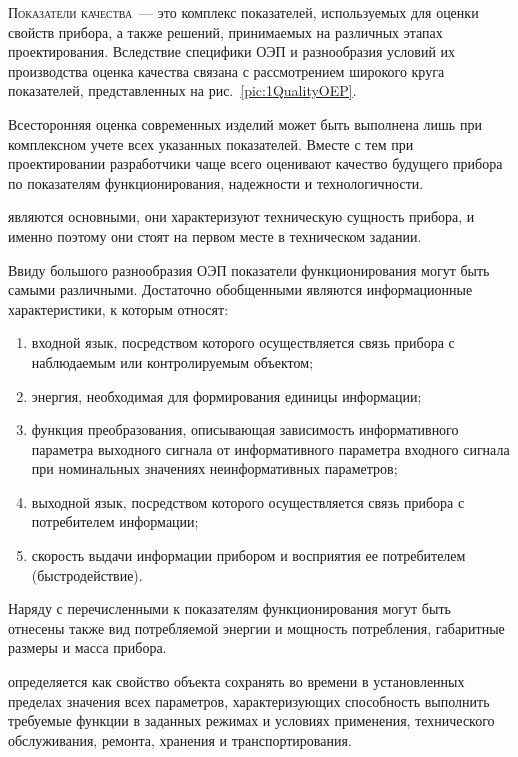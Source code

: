\documentclass{tufte-book}
\begin{document}
\textsc{Показатели качества}~--- это комплекс показателей, используемых для оценки свойств прибора, а также решений, принимаемых на различных этапах проектирования. Вследствие специфики ОЭП и разнообразия условий их производства оценка качества связана с рассмотрением широкого круга показателей, представленных на рис.~\ref{pic:1QualityOEP}.


Всесторонняя оценка современных изделий может быть выполнена лишь при комплексном учете всех указанных показателей. Вместе с тем при проектировании разработчики чаще всего оценивают качество будущего прибора по показателям функционирования, надежности и технологичности.

 являются основными, они характеризуют техническую сущность прибора, и именно поэтому они стоят на первом месте в техническом задании.

Ввиду большого разнообразия ОЭП показатели функционирования могут быть самыми различными. Достаточно обобщенными являются информационные характеристики, к которым относят:
\begin{enumerate}
	\item входной язык, посредством которого осуществляется связь прибора с наблюдаемым или контролируемым объектом;
	\item энергия, необходимая для формирования единицы информации;
	\item функция преобразования, описывающая зависимость информативного параметра выходного сигнала от информативного параметра входного сигнала при номинальных значениях неинформативных параметров;
	\item выходной язык, посредством которого осуществляется связь прибора с потребителем информации;
	\item скорость выдачи информации прибором и восприятия ее потребителем (быстродействие).
\end{enumerate}

Наряду с перечисленными к показателям функционирования могут быть отнесены также вид потребляемой энергии и мощность потребления, габаритные размеры и масса прибора.

 определяется как свойство объекта сохранять во времени в установленных пределах значения всех параметров, характеризующих способность выполнить требуемые функции в заданных режимах и условиях применения, технического обслуживания, ремонта, хранения и транспортирования.
\end{document}
